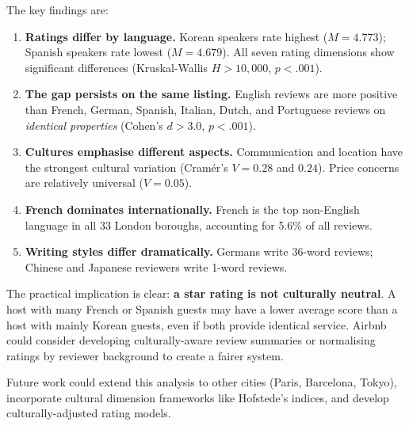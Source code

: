 \documentclass[12pt,a4paper]{article}
\begin{document}
The key findings are:
\begin{enumerate}[nosep]
    \item \textbf{Ratings differ by language.} Korean speakers rate highest ($M = 4.773$); Spanish speakers rate lowest ($M = 4.679$). All seven rating dimensions show significant differences (Kruskal-Wallis $H > 10{,}000$, $p < .001$).
    \item \textbf{The gap persists on the same listing.} English reviews are more positive than French, German, Spanish, Italian, Dutch, and Portuguese reviews on \emph{identical properties} (Cohen's $d > 3.0$, $p < .001$).
    \item \textbf{Cultures emphasise different aspects.} Communication and location have the strongest cultural variation (Cram\'{e}r's $V = 0.28$ and $0.24$). Price concerns are relatively universal ($V = 0.05$).
    \item \textbf{French dominates internationally.} French is the top non-English language in all 33 London boroughs, accounting for 5.6\% of all reviews.
    \item \textbf{Writing styles differ dramatically.} Germans write 36-word reviews; Chinese and Japanese reviewers write 1-word reviews.
\end{enumerate}

The practical implication is clear: \textbf{a star rating is not culturally neutral}.
A host with many French or Spanish guests may have a lower average score than a host with mainly Korean guests, even if both provide identical service.
Airbnb could consider developing culturally-aware review summaries or normalising ratings by reviewer background to create a fairer system.

Future work could extend this analysis to other cities (Paris, Barcelona, Tokyo), incorporate cultural dimension frameworks like Hofstede's indices, and develop culturally-adjusted rating models.
\end{document}
